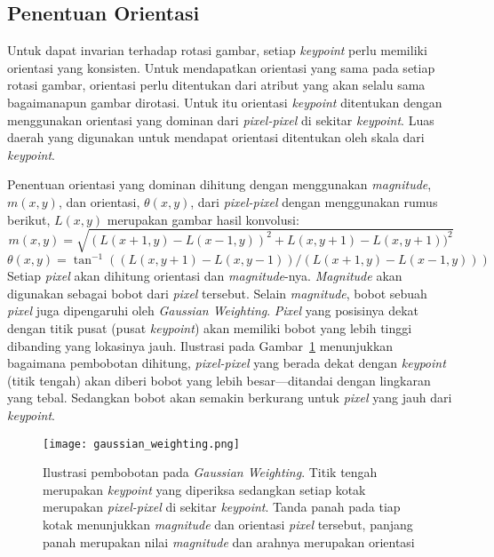 \subsection{Penentuan Orientasi}
Untuk dapat invarian terhadap rotasi gambar, setiap \textit{keypoint} perlu memiliki orientasi yang konsisten. Untuk mendapatkan orientasi yang sama pada setiap rotasi gambar, orientasi perlu ditentukan dari atribut yang akan selalu sama bagaimanapun gambar dirotasi. Untuk itu orientasi \textit{keypoint} ditentukan dengan menggunakan orientasi yang dominan dari \textit{pixel-pixel} di sekitar \textit{keypoint}. Luas daerah yang digunakan untuk mendapat orientasi ditentukan oleh skala dari \textit{keypoint}. 

Penentuan orientasi yang dominan dihitung dengan menggunakan \textit{magnitude}, $m(x,y)$, dan orientasi, $\theta(x,y)$, dari \textit{pixel-pixel} dengan menggunakan rumus berikut, $L(x,y)$ merupakan gambar hasil konvolusi:
\begin{equation}
	\label{eq:magnitude}
	m(x,y)=\sqrt{(L(x+1,y)-L(x-1,y))^{2}+L(x,y+1)-L(x,y+1))^{2}}
\end{equation}
\begin{equation}
	\label{eq:orientasi}
	\theta(x,y)=\tan^{-1}((L(x,y+1)-L(x,y-1))/(L(x+1,y)-L(x-1,y)))
\end{equation}
Setiap \textit{pixel} akan dihitung orientasi dan \textit{magnitude}-nya. \textit{Magnitude} akan digunakan sebagai bobot dari \textit{pixel} tersebut. Selain \textit{magnitude}, bobot sebuah \textit{pixel} juga dipengaruhi oleh \textit{Gaussian Weighting}. \textit{Pixel} yang posisinya dekat dengan titik pusat (pusat \textit{keypoint}) akan memiliki bobot yang lebih tinggi dibanding yang lokasinya jauh. Ilustrasi pada Gambar~\ref{fig:gaussian_weighting} menunjukkan bagaimana pembobotan dihitung, \textit{pixel-pixel} yang berada dekat dengan \textit{keypoint} (titik tengah) akan diberi bobot yang lebih besar---ditandai dengan lingkaran yang tebal. Sedangkan bobot akan semakin berkurang untuk \textit{pixel} yang jauh dari \textit{keypoint}.
\begin{figure}[H]
	\centering
	\texttt{[image: gaussian\_weighting.png]}
	\caption{Ilustrasi pembobotan pada \textit{Gaussian Weighting}. Titik tengah merupakan \textit{keypoint} yang diperiksa sedangkan setiap kotak merupakan \textit{pixel-pixel} di sekitar \textit{keypoint}. Tanda panah pada tiap kotak menunjukkan \textit{magnitude} dan orientasi \textit{pixel} tersebut, panjang panah merupakan nilai \textit{magnitude} dan arahnya merupakan orientasi}
	\label{fig:gaussian_weighting}
\end{figure} 

